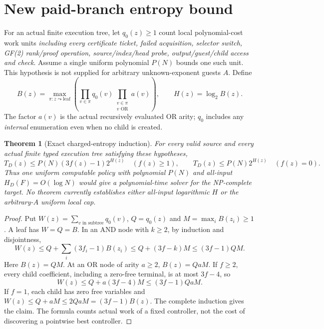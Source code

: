 \documentclass[11pt]{article}
\newtheorem{theorem}{Theorem}
\begin{document}
\section{New paid-branch entropy bound}
For an actual finite execution tree, let $q_0(z)\ge1$ count local polynomial-cost work units \emph{including every certificate ticket, failed acquisition, selector switch, GF(2) rank/proof operation, source/index/head probe, output/guest/child access and check}. Assume a single uniform polynomial $P(N)$ bounds one such unit. This hypothesis is not supplied for arbitrary unknown-exponent guests $A$. Define
\[
 B(z)=\max_{\pi:z\leadsto\mathrm{leaf}}\left(\prod_{v\in\pi}q_0(v)\prod_{\substack{v\in\pi\\v\text{ OR}}}a(v)\right),\qquad H(z)=\log_2B(z).
\]
The factor $a(v)$ is the actual recursively evaluated OR arity; $q_0$ includes any \emph{internal} enumeration even when no child is created.
\begin{theorem}[Exact charged-entropy induction]
For every valid source and every actual finite typed execution tree satisfying these hypotheses,
\[
 T_D(z)\le P(N)(3f(z)-1)2^{H(z)}\quad(f(z)\ge1),\qquad
 T_D(z)\le P(N)2^{H(z)}\quad(f(z)=0).
\]
Thus one uniform computable policy with polynomial $P(N)$ and all-input $H_D(F)=O(\log N)$ would give a polynomial-time solver for the NP-complete target. No theorem currently establishes either all-input logarithmic $H$ or the arbitrary-$A$ uniform local cap.
\end{theorem}
\begin{proof}
Put $W(z)=\sum_{v\text{ in subtree}}q_0(v)$, $Q=q_0(z)$ and $M=\max_i B(z_i)\ge1$. A leaf has $W=Q=B$. In an AND node with $k\ge2$, by induction and disjointness,
\[
 W(z)\le Q+\sum_i(3f_i-1)B(z_i)\le Q+(3f-k)M\le(3f-1)QM.
\]
Here $B(z)=QM$. At an OR node of arity $a\ge2$, $B(z)=QaM$. If $f\ge2$, every child coefficient, including a zero-free terminal, is at most $3f-4$, so
\[
 W(z)\le Q+a(3f-4)M\le(3f-1)QaM.
\]
If $f=1$, each child has zero free variables and $W(z)\le Q+aM\le2QaM=(3f-1)B(z)$. The complete induction gives the claim. The formula counts actual work of a fixed controller, not the cost of discovering a pointwise best controller.
\end{proof}
\end{document}
